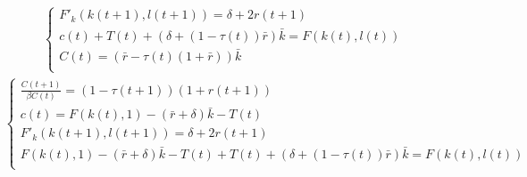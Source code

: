 \documentclass[a4paper]{article}
\begin{document}
\begin{enumerate}
\begin{enumerate}[(a)]
\begin{align*}
\begin{cases}
F'_k(k(t+1), l(t+1)) = \delta +2r(t+1)\\
c(t) + T(t) + (\delta + (1-\tau(t))\bar{r})\bar{k} = F(k(t), l(t))\\
C(t) = (\bar{r} - \tau(t)(1 + \bar{r}))\bar{k}\\
\end{cases}
\end{align*}
\begin{align*}
\begin{cases}
\frac{C(t+1)}{\beta C(t)} = (1 - \tau(t+1))(1 + r(t+1))\\
c(t) = F(k(t), 1) - (\bar{r} +\delta)\bar{k} - T(t)\\
F'_k(k(t+1), l(t+1)) = \delta +2r(t+1)\\
F(k(t), 1) - (\bar{r} +\delta)\bar{k} - T(t) + T(t) + (\delta + (1-\tau(t))\bar{r})\bar{k} = F(k(t), l(t))\\
\end{cases}
\end{align*}
\end{enumerate}
	\end{enumerate}
\end{document}
